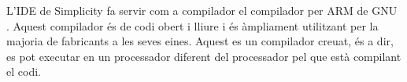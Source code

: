L'\gls{IDE} de Simplicity fa servir com a compilador el compilador per ARM de GNU \cite{ARMGNU}. Aquest compilador és de codi obert i lliure i és àmpliament utilitzant per la majoria de fabricants a les seves eines. Aquest es un compilador creuat, és a dir, es pot executar en un processador diferent del processador pel que està compilant el codi.


